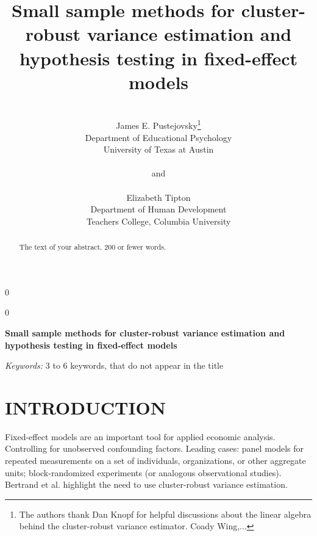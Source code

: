 \documentclass[12pt]{article}\usepackage[]{graphicx}\usepackage[]{color}
\newcommand{\blind}{0}
\begin{document}

\def\spacingset#1{\renewcommand{\baselinestretch}%
{#1}\small\normalsize} \spacingset{1}



\blind
{
  \title{\bf Small sample methods for cluster-robust variance estimation and hypothesis testing in fixed-effect models}
  \author{\\James E. Pustejovsky\thanks{
    The authors thank Dan Knopf for helpful discussions about the linear algebra behind the cluster-robust variance estimator. Coady Wing,...}\hspace{.2cm}\\
    Department of Educational Psychology \\ 
    University of Texas at Austin\\ \\
    and \\ \\
    Elizabeth Tipton \\
    Department of Human Development \\ 
    Teachers College, Columbia University}
  \maketitle
} \fi

\blind
{
  \bigskip
  \bigskip
  \bigskip
  \begin{center}
    {\LARGE\bf Small sample methods for cluster-robust variance estimation and hypothesis testing in fixed-effect models}
\end{center}
  \medskip
} \fi

\bigskip
\begin{abstract}
The text of your abstract.  200 or fewer words.
\end{abstract}

\noindent%
{\it Keywords:}  3 to 6 keywords, that do not appear in the title
\vfill

\newpage
\spacingset{1.45} %

\section{INTRODUCTION}
\label{sec:intro}



Fixed-effect models are an important tool for applied economic analysis. 
Controlling for unobserved confounding factors.
Leading cases: panel models for repeated measurements on a set of individuals, organizations, or other aggregate units; block-randomized experiments (or analogous observational studies). 
Bertrand et al. highlight the need to use cluster-robust variance estimation.
\end{document}
